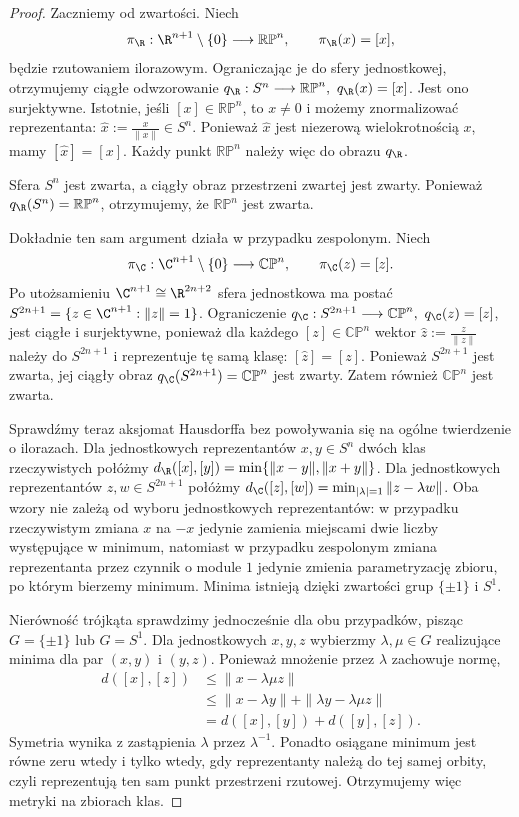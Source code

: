 \begin{proof}
Zaczniemy od zwartości. Niech
\[
\pi_{\R}:\R^{n+1}\setminus\{0\}\longrightarrow\mathbb{RP}^n,
\qquad
\pi_{\R}(x)=[x],
\]
będzie rzutowaniem ilorazowym. Ograniczając je do sfery jednostkowej,
otrzymujemy ciągłe odwzorowanie $q_{\R}:S^n\longrightarrow\mathbb{RP}^n, \ q_{\R}(x)=[x]$.
Jest ono surjektywne. Istotnie, jeśli $[x]\in\mathbb{RP}^n$,
to $x\neq0$ i możemy znormalizować reprezentanta: $\widehat{x}:=\frac{x}{\|x\|}\in S^n$.
Ponieważ $\widehat{x}$ jest niezerową wielokrotnością $x$, mamy $[\widehat{x}]=[x]$.
Każdy punkt $\mathbb{RP}^n$ należy więc do obrazu $q_{\R}$.

Sfera $S^n$ jest zwarta, a ciągły obraz przestrzeni zwartej jest zwarty.
Ponieważ $q_{\R}(S^n)=\mathbb{RP}^n$,
otrzymujemy, że $\mathbb{RP}^n$ jest zwarta.

Dokładnie ten sam argument działa w przypadku zespolonym. Niech
\[
\pi_{\C}:\C^{n+1}\setminus\{0\}\longrightarrow\mathbb{CP}^n,
\qquad
\pi_{\C}(z)=[z].
\]
Po utożsamieniu $\C^{n+1}\cong\R^{2n+2}$ sfera jednostkowa ma postać $S^{2n+1} = \{z\in\C^{n+1}:\|z\|=1\}$.
Ograniczenie $q_{\C}:S^{2n+1}\longrightarrow\mathbb{CP}^n, \ q_{\C}(z)=[z]$,
jest ciągłe i surjektywne, ponieważ dla każdego $[z]\in\mathbb{CP}^n$
wektor $\widehat{z}:=\frac{z}{\|z\|}$
należy do $S^{2n+1}$ i reprezentuje tę samą klasę: $[\widehat{z}]=[z]$.
Ponieważ $S^{2n+1}$ jest zwarta, jej ciągły obraz $q_{\C}(S^{2n+1})=\mathbb{CP}^n$
jest zwarty. Zatem również $\mathbb{CP}^n$ jest zwarta.

Sprawdźmy teraz aksjomat Hausdorffa bez powoływania się na ogólne
twierdzenie o ilorazach. Dla jednostkowych reprezentantów $x,y\in S^n$
dwóch klas rzeczywistych połóżmy $d_{\R}([x],[y]) = \min\{\|x-y\|,\|x+y\|\}$.
Dla jednostkowych reprezentantów $z,w\in S^{2n+1}$ połóżmy $d_{\C}([z],[w]) = \min_{|\lambda|=1}\|z-\lambda w\|$.
Oba wzory nie zależą od wyboru jednostkowych reprezentantów:
w przypadku rzeczywistym zmiana $x$ na $-x$ jedynie zamienia miejscami
dwie liczby występujące w minimum, natomiast w przypadku zespolonym
zmiana reprezentanta przez czynnik o module $1$ jedynie zmienia
parametryzację zbioru, po którym bierzemy minimum. Minima istnieją
dzięki zwartości grup $\{\pm1\}$ i $S^1$.

Nierówność trójkąta sprawdzimy jednocześnie dla obu przypadków,
pisząc $G=\{\pm1\}$ lub $G=S^1$. Dla jednostkowych $x,y,z$
wybierzmy $\lambda,\mu\in G$ realizujące minima dla par $(x,y)$ i $(y,z)$.
Ponieważ mnożenie przez $\lambda$ zachowuje normę,
\begin{align*}
d([x],[z])&\leq\|x-\lambda\mu z\|\\
&\leq\|x-\lambda y\|+\|\lambda y-\lambda\mu z\|\\
&=d([x],[y])+d([y],[z]).
\end{align*}
Symetria wynika z zastąpienia $\lambda$ przez $\lambda^{-1}$.
Ponadto osiągane minimum jest równe zeru wtedy i tylko wtedy,
gdy reprezentanty należą do tej samej orbity, czyli reprezentują
ten sam punkt przestrzeni rzutowej. Otrzymujemy więc metryki na zbiorach klas.


\end{proof}
